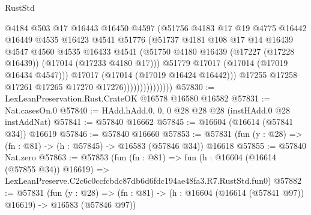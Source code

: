 \begin{lexlean}{RustStd}
\begin{coremodule}
                                  @4184
                                  @503
                                  @17
                                  @16443
                                  @16450
                                  @4597
                                  (@51756
                                    @4183
                                    @17
                                    @19
                                    @4775
                                    @16442
                                    @16449
                                    @4535
                                    @16423
                                    @4541
                                    @51776
                                    (@51737
                                      @4181
                                      @108
                                      @17
                                      @14
                                      @16439
                                      @4547
                                      @4560
                                      @4535
                                      @16433
                                      @4541
                                      (@51750
                                        @4180
                                        @16439
                                        (@17227 (@17228 @16439))
                                        (@17014 (@17233 @4180 @17)))
                                      @51779
                                      @17017
                                      (@17014 (@17019 @16434 @4547)))
                                    @17017
                                    (@17014 (@17019 @16424 @16442)))
                                  @17255
                                  @17258
                                  @17261
                                  @17265
                                  @17270
                                  @17276)))))))))))))))
@57830 := LexLeanPreservation.Rust.CrateOK @16578 @16580 @16582
@57831 := Nat.casesOn.{0}
@57840 := HAdd.hAdd.{0, 0, 0} @28 @28 @28 (instHAdd.{0} @28 instAddNat)
@57841 := @57840 @16662
@57845 := @16604 (@16614 (@57841 @34)) @16619
@57846 := @57840 @16660
@57853 := @57831 (fun (y : @28) => (fn : @81) -> (h : @57845) -> @16583 (@57846 @34)) @16618
@57855 := @57840 Nat.zero
@57863 := @57853
    (fun (fn : @81) =>
    fun (h : @16604 (@16614 (@57855 @34)) @16619) =>
    LexLeanPreserve.C2c6c0ccfcbdc87db6d6fdc194ae48fa3.R7.RustStd.fun0)
@57882 := @57831
    (fun (y : @28) =>
    (fn : @81) -> (h : @16604 (@16614 (@57841 @97)) @16619) -> @16583 (@57846 @97))

\end{coremodule}
\end{lexlean}

